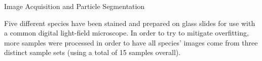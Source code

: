 Image Acquisition and Particle Segmentation

Five different species have been stained and prepared on glass slides for use with a common digital light-field microscope. In order to try to mitigate overfitting, more samples were processed in order to have all species’ images come from three distinct sample sets (using a total of 15 samples overall).
  
  